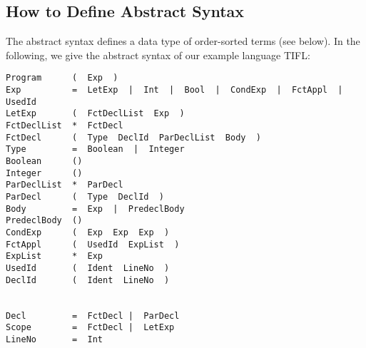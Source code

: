\subsection{How to Define Abstract Syntax}

The abstract syntax defines a data type of order-sorted terms (see 
below). In the following, we give the abstract syntax of our 
example language TIFL:
\begin{verbatim}
Program      (  Exp  )
Exp          =  LetExp  |  Int  |  Bool  |  CondExp  |  FctAppl  |  UsedId
LetExp       (  FctDeclList  Exp  )
FctDeclList  *  FctDecl
FctDecl      (  Type  DeclId  ParDeclList  Body  )
Type         =  Boolean  |  Integer
Boolean      ()
Integer      ()
ParDeclList  *  ParDecl
ParDecl      (  Type  DeclId  )
Body         =  Exp  |  PredeclBody
PredeclBody  () 
CondExp      (  Exp  Exp  Exp  )
FctAppl      (  UsedId  ExpList  )
ExpList      *  Exp
UsedId       (  Ident  LineNo  )
DeclId       (  Ident  LineNo  )


Decl         =  FctDecl |  ParDecl
Scope        =  FctDecl |  LetExp
LineNo       =  Int
\end{verbatim}
  
